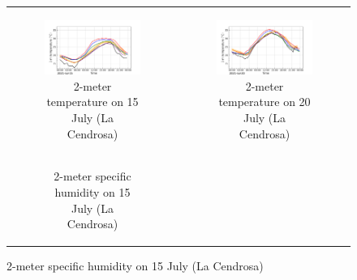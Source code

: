 
\begin{figure}[hbtp]
    \centering
    \begin{tabular}{cc}
        \begin{subfigure}[t]{0.5\textwidth}
            \caption{2-meter temperature on 15 July (La Cendrosa)}
            \includegraphics[width=\textwidth]{images/chap5/IOP_TS/TS_2021-07-15_cendrosa_t2m.png}
        \end{subfigure} &
        \begin{subfigure}[t]{0.5\textwidth}
            \caption{2-meter temperature on 20 July (La Cendrosa)}
            \includegraphics[width=\textwidth]{images/chap5/IOP_TS/TS_2021-07-20_cendrosa_t2m.png}
        \end{subfigure} \\
        \begin{subfigure}[t]{0.5\textwidth}
            \caption{2-meter specific humidity on 15 July (La Cendrosa)}

\end{subfigure}
\end{tabular}
\end{figure}
